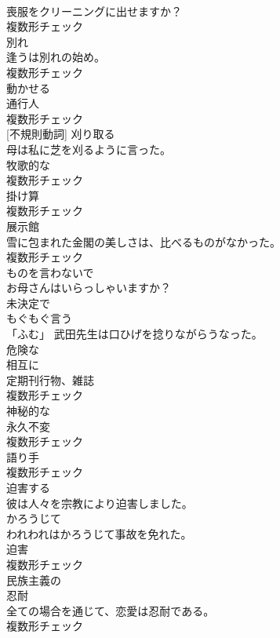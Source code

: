 \documentclass[8pt]{extreport}
\begin{document}
\begin{CJK}{UTF8}{min}
\\	喪服をクリーニングに出せますか？	
\\	複数形チェック
\\	[名詞]	別れ	
\\	逢うは別れの始め。	
\\	複数形チェック
\\	[形容詞]	動かせる	
\\	[名詞]	通行人	
\\	複数形チェック
\\	[動詞] [不規則動詞]	刈り取る	
\\	母は私に芝を刈るように言った。	
\\	[名詞]	牧歌的な	
\\	複数形チェック
\\	[名詞]	掛け算	
\\	複数形チェック
\\	[名詞]	展示館	
\\	雪に包まれた金閣の美しさは、比べるものがなかった。	
\\	複数形チェック
\\	[形容詞]	ものを言わないで	
\\	お母さんはいらっしゃいますか？	
\\	[形容詞]	未決定で	
\\	[動詞]	もぐもぐ言う	
\\	「ふむ」 武田先生は口ひげを捻りながらうなった。	
\\	[形容詞]	危険な	
\\	[副詞]	相互に	
\\	[名詞]	定期刊行物、雑誌	
\\	複数形チェック
\\	[形容詞]	神秘的な	
\\	[名詞]	永久不変	
\\	複数形チェック
\\	[名詞]	語り手	
\\	複数形チェック
\\	[動詞]	迫害する	
\\	彼は人々を宗教により迫害しました。	
\\	[副詞]	かろうじて	
\\	われわれはかろうじて事故を免れた。	
\\	[名詞]	迫害	
\\	複数形チェック
\\	[形容詞]	⺠族主義の	
\\	[名詞]	忍耐	
\\	全ての場合を通じて、恋愛は忍耐である。	
\\	複数形チェック

\end{CJK}
\end{document}
